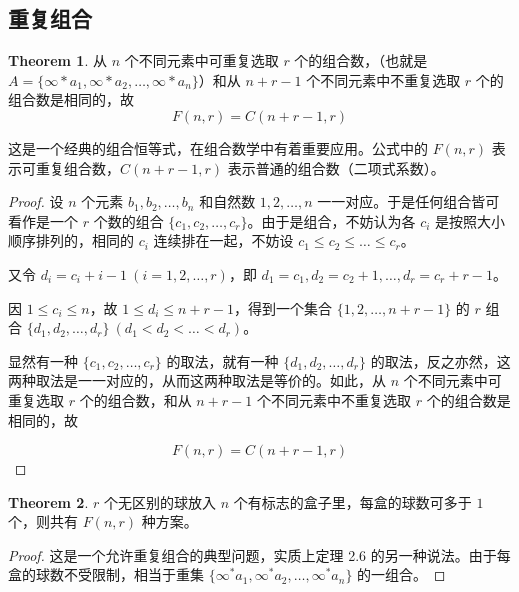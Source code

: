\documentclass[oneside]{book}
\theoremstyle{definition}
\newtheorem{theorem}{Theorem}[section]
\begin{document}
\subsection{重复组合}
\begin{theorem}
	从 \( n \) 个不同元素中可重复选取 \( r \) 个的组合数，（也就是\( A=\{\infty * a_1, \infty * a_2, \ldots, \infty * a_n\} \)）和从 \( n+r-1 \) 个不同元素中不重复选取 \( r \) 个的组合数是相同的，故\[F(n,r) = C(n+r-1, r)\]
\end{theorem}
这是一个经典的组合恒等式，在组合数学中有着重要应用。公式中的 $F(n,r)$ 表示可重复组合数，$C(n+r-1, r)$ 表示普通的组合数（二项式系数）。
\begin{proof}
	设 \( n \) 个元素 \( b_1, b_2, \ldots, b_n \) 和自然数 \( 1, 2, \ldots, n \) 一一对应。于是任何组合皆可看作是一个 \( r \) 个数的组合 \(\{c_1, c_2, \ldots, c_r\}\)。由于是组合，不妨认为各 \( c_i \) 是按照大小顺序排列的，相同的 \( c_i \) 连续排在一起，不妨设 \( c_1 \leq c_2 \leq \ldots \leq c_r \)。
	
	又令 \( d_i = c_i + i - 1 \ (i = 1, 2, \ldots, r) \)，即 \( d_1 = c_1, d_2 = c_2 + 1, \ldots, d_r = c_r + r - 1 \)。
	
	因 \( 1 \leq c_i \leq n \)，故 \( 1 \leq d_i \leq n + r - 1 \)，得到一个集合 \(\{1, 2, \ldots, n + r - 1\}\) 的 \(r\) 组合 \(\{d_1, d_2, \ldots, d_r\} \ (d_1 < d_2 < \ldots < d_r)\)。
	
	显然有一种 \(\{c_1, c_2, \ldots, c_r\}\) 的取法，就有一种 \(\{d_1, d_2, \ldots, d_r\}\) 的取法，反之亦然，这两种取法是一一对应的，从而这两种取法是等价的。如此，从 \( n \) 个不同元素中可重复选取 \( r \) 个的组合数，和从 \( n + r - 1 \) 个不同元素中不重复选取 \( r \) 个的组合数是相同的，故
	
	\[F(n, r) = C(n + r - 1, r)\]
\end{proof}
\begin{theorem}
	$r$ 个无区别的球放入 $n$ 个有标志的盒子里，每盒的球数可多于 $1$ 个，则共有 $F(n,r)$ 种方案。
\end{theorem}

\begin{proof}
	这是一个允许重复组合的典型问题，实质上定理 2.6 的另一种说法。由于每盒的球数不受限制，相当于重集 $\{ \infty^* a_1, \infty^* a_2, \ldots, \infty^* a_n \}$ 的一组合。
\end{proof}
\end{document}
